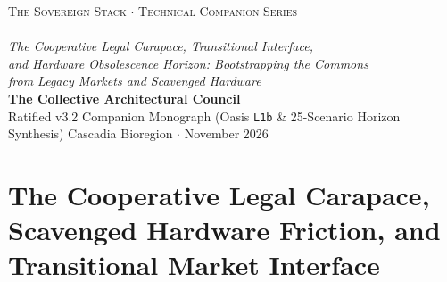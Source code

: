 \documentclass[11pt,a4paper]{book}
\DeclareRobustCommand{\_}{\ifmmode\text{\symbol{95}}\else\symbol{95}\allowbreak\fi}
\theoremstyle{plain}
\theoremstyle{definition}
\begin{document}
\frontmatter
\begin{titlepage}
    \thispagestyle{empty}
    \begin{center}
        \vspace*{2.8cm}
        {\Large \textsc{The Sovereign Stack $\cdot$ Technical Companion Series}} \\[1.0cm]
        {} \\[0.75cm]
        {\Large \textit{The Cooperative Legal Carapace, Transitional Interface,}} \\[0.22cm]
        {\Large \textit{and Hardware Obsolescence Horizon: Bootstrapping the Commons}} \\[0.22cm]
        {\Large \textit{from Legacy Markets and Scavenged Hardware}} \\[2.2cm]
        {\large \textbf{The Collective Architectural Council}} \\[0.4cm]
        {\normalsize Ratified v3.2 Companion Monograph (Oasis \texttt{L1b} \& 25-Scenario Horizon Synthesis)}
        \vfill
        {\large Cascadia Bioregion $\cdot$ November 2026}
        \vspace*{1.8cm}
    \end{center}
    \clearpage
\end{titlepage}

\tableofcontents



\mainmatter

\part{The Cooperative Legal Carapace, Scavenged Hardware Friction, and Transitional Market Interface}











\end{document}
